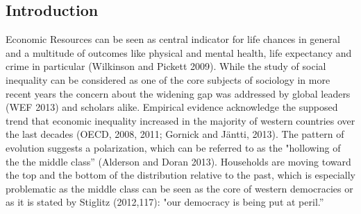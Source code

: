 \documentclass[twoside]{article}\usepackage[]{graphicx}\usepackage[]{color}
\begin{document}
\begin{multicols}{2} %




\section{Introduction}





Economic Resources can be seen as central indicator for life chances in general and a multitude of outcomes like physical and mental health, life expectancy and crime in particular (Wilkinson and Pickett 2009). While the study of social inequality can be considered as one of the core subjects of sociology in more recent years the concern about the widening gap was addressed by global leaders (WEF 2013) and scholars alike. Empirical evidence acknowledge the supposed trend that economic inequality increased in the majority of western countries over the last decades (OECD, 2008, 2011; Gornick and Jäntti, 2013). The pattern of evolution suggests a polarization, which can be referred to as the "hollowing of the the middle class'' (Alderson and Doran 2013). Households are moving toward the top and the bottom of the distribution relative to the past, which is especially problematic as the middle class can be seen as the core of western democracies or as it is stated by Stiglitz (2012,117): "our democracy is being put at peril.''
\\





\end{multicols}
\end{document}
